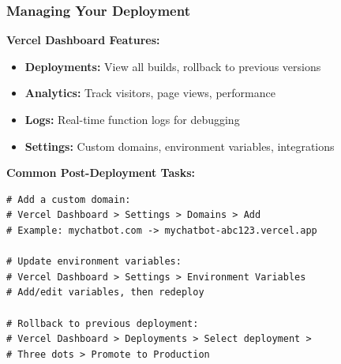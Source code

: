 \begin{frame}[fragile]\frametitle{Managing Your Deployment}
\textbf{Vercel Dashboard Features:}
  \begin{itemize}
    \item \textbf{Deployments:} View all builds, rollback to previous versions
    \item \textbf{Analytics:} Track visitors, page views, performance
    \item \textbf{Logs:} Real-time function logs for debugging
    \item \textbf{Settings:} Custom domains, environment variables, integrations
  \end{itemize}

\textbf{Common Post-Deployment Tasks:}

\begin{lstlisting}
# Add a custom domain:
# Vercel Dashboard > Settings > Domains > Add
# Example: mychatbot.com -> mychatbot-abc123.vercel.app

# Update environment variables:
# Vercel Dashboard > Settings > Environment Variables
# Add/edit variables, then redeploy

# Rollback to previous deployment:
# Vercel Dashboard > Deployments > Select deployment >
# Three dots > Promote to Production
\end{lstlisting}
\end{frame}


